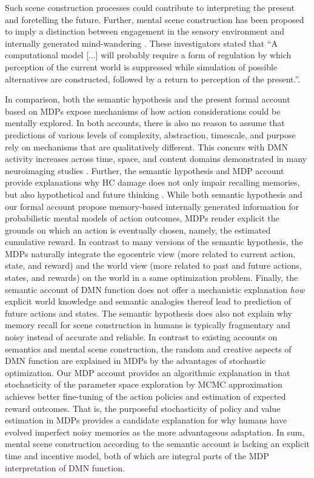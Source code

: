 \documentclass[10pt,letterpaper]{article}
\begin{document}
Such scene construction processes could contribute to interpreting the
present and foretelling the future.
Further,
mental scene construction has been proposed
to imply a distinction between
engagement in the sensory environment
and internally generated mind-wandering
\citep{buckner2007self}.
These investigators stated that
``A computational model [...] will probably require a form of
regulation by which perception of the current world is suppressed
while simulation of possible alternatives are constructed,
followed by a return to perception of the present.''.


In comparison,
both the semantic hypothesis and the present formal account based on MDPs
expose mechanisms of how action considerations could be mentally explored.
In both accounts,
there is also no reason to assume that predictions of various
levels of complexity, abstraction, timescale, and purpose
rely on mechanisms that are qualitatively different. This concurs with
DMN activity increases across time, space, and content domains
demonstrated in many neuroimaging studies
\citep{spreng2009common, laird2009, bzdok2012morality, binder2009}.
Further, the semantic hypothesis
and MDP account provide explanations why HC damage does
not only impair recalling memories, but also hypothetical and future
thinking \citep{hassabis2007patients}.
While both semantic hypothesis and
our formal account propose memory-based internally
generated information for probabilistic mental models of action outcomes,
MDPs render explicit the grounds on which an action is
eventually chosen, namely, the estimated cumulative reward.
In contrast to many versions of the semantic hypothesis,
the MDPs naturally integrate the egocentric view
(more related to current action, state, and reward) and the
world view (more related to past and future actions, states, and rewards)
on the world in a same optimization problem.
Finally,
the semantic account of DMN function does not offer
a mechanistic explanation \textit{how}
explicit world knowledge and semantic analogies thereof
lead to prediction of future actions and states.
The semantic hypothesis does also not explain why memory recall
for scene construction in humans is typically fragmentary and noisy
instead of accurate and reliable.
In contrast to existing accounts on semantics and
mental scene construction, the random and creative aspects of DMN function
are explained in MDPs by the advantages of stochastic optimization.
Our MDP account provides an algorithmic explanation in that
stochasticity of the parameter space exploration
by MCMC approximation achieves better fine-tuning of the
action policies and estimation of expected reward outcomes.
That is, the purposeful stochasticity of policy and value estimation
in MDPs provides a candidate explanation for why humans
have evolved imperfect noisy memories
as the more advantageous adaptation.
In sum, mental scene construction according to the semantic
account is lacking an explicit time and incentive model,
both of which are integral parts of the MDP interpretation of DMN function.
\end{document}
